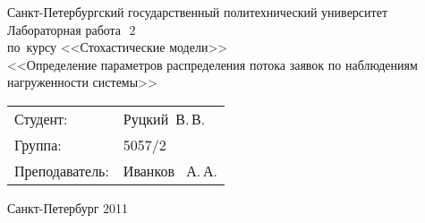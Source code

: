 %
%

\begin{titlepage} %

\begin{center} %

\large Санкт-Петербургский государственный политехнический университет\\[5.5cm]

\huge Лабораторная работа~\No\,2\\[0.6cm] %
\large по~курсу <<Стохастические модели>>\\[1cm]
\large <<Определение параметров распределения потока заявок %
по наблюдениям нагруженности системы>>\\[6cm]

\begin{flushright} %
\begin{tabular}{l l}
Студент: & Руцкий~В.\,В.\\
Группа: & 5057/2\\
Преподаватель: & Иванков ~А.\,А.
\end{tabular}
\end{flushright} %

\vfill %

{\large Санкт-Петербург 2011}
\end{center} %
\thispagestyle{empty} %
\end{titlepage} %

